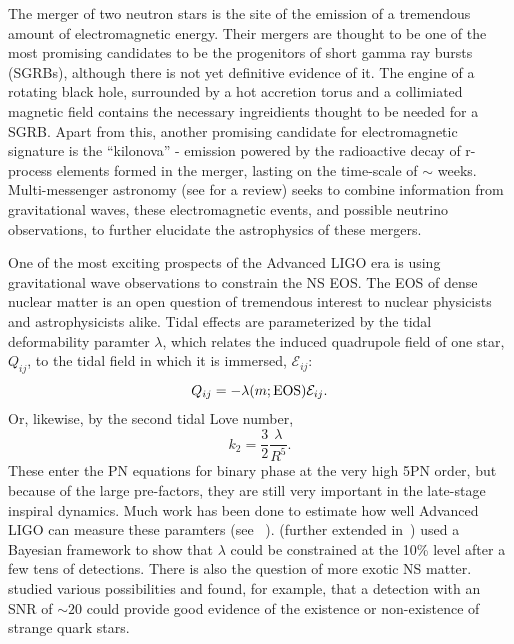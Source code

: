 The merger of two neutron stars is the site of the emission of a tremendous amount of electromagnetic energy. Their mergers are thought to be one of the most promising candidates to be the progenitors of short gamma ray bursts (SGRBs), although there is not yet definitive evidence of it. The engine of a rotating black hole, surrounded by a hot accretion torus and a collimiated magnetic field contains the necessary ingreidients thought to be needed for a SGRB. Apart from this, another promising candidate for electromagnetic signature is the ``kilonova'' - emission powered by the radioactive decay of r-process elements formed in the merger, lasting on the time-scale of $\sim$ weeks. Multi-messenger astronomy (see \cite{Fan:2015bia} for a review) seeks to combine information from gravitational waves, these electromagnetic events, and possible neutrino observations, to further elucidate the astrophysics of these mergers.

One of the most exciting prospects of the Advanced LIGO era is using gravitational wave observations to constrain the NS EOS. The EOS of dense nuclear matter is an open question of tremendous interest to nuclear physicists and astrophysicists alike. Tidal effects are parameterized by the tidal deformability paramter $\lambda$, which relates the induced quadrupole field of one star, $Q_{ij}$, to the tidal field in which it is immersed, $\mathcal{E}_{ij}$:
\begin{equation}
Q_{ij}=-\lambda(m;{\rm EOS})\mathcal{E}_{ij}.
\end{equation}
Or, likewise, by the second tidal Love number,
\begin{equation}
k_2=\frac{3}{2}\frac{\lambda}{R^5}.
\end{equation}
These enter the PN equations for binary phase at the very high 5PN order, but because of the large pre-factors, they are still very important in the late-stage inspiral dynamics. Much work has been done to estimate how well Advanced LIGO can measure these paramters (see ~\cite{Read2009b,Hinderer2010,damour:12,Lackey2011}). \cite{DelPozzo:13} (further extended in~\cite{Agathos:2015a}) used a Bayesian framework to show that $\lambda$ could be constrained at the 10\% level after a few tens of detections. There is also the question of more exotic NS matter. \cite{Chatziioannou:2015uea} studied various possibilities and found, for example, that a detection with an SNR of $\sim 20$ could provide good evidence of the existence or non-existence of strange quark stars.

